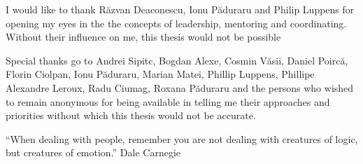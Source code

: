 \vspace*{7cm}
\begin{center}
I would like to thank R\u{a}zvan Deaconescu, Ionu P\u{a}duraru and Philip Luppens for opening my eyes in the the concepts of leadership, mentoring and coordinating. Without their influence on me, this thesis would not be possible

Special thanks go to Andrei Sipitc, Bogdan Alexe, Cosmin V\u{a}sii, Daniel Poirc\u{a}, Florin Ciolpan, Ionu P\u{a}duraru, Marian Matei, Phillip Luppens, Phillipe Alexandre Leroux, Radu Ciumag, Roxana P\u{a}duraru and the persons who wished to remain anonymous for being available in telling me their approaches and priorities without which this thesis would not be accurate.
\end{center}
\vspace{0.6cm}
\begin{center}
\begin{displayquote}
``When dealing with people, remember you are not dealing with creatures of logic, but creatures of emotion.'' Dale Carnegie
\end{displayquote}
\end{center}
